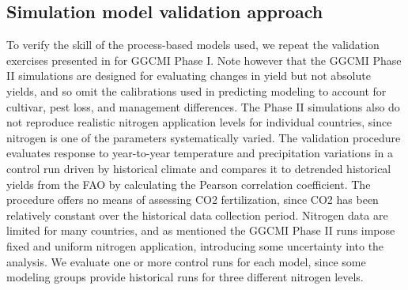 \documentclass[preprint, 5p, times, twocolumn]{elsarticle}
\begin{document}
\subsection{Simulation model validation approach}
To verify the skill of the process-based models used, we repeat the validation exercises presented in \citet{muller_global_2017} for GGCMI Phase I. Note however that the GGCMI Phase II simulations are designed for evaluating changes in yield but not absolute yields, and so omit the calibrations used in predicting modeling to account for cultivar, pest loss, and management differences. The Phase II simulations also do not reproduce realistic nitrogen application levels for individual countries, since nitrogen is one of the parameters systematically varied. The \citet{muller_global_2017} validation procedure evaluates response to year-to-year temperature and precipitation variations in a control run driven by historical climate and compares it to detrended historical yields from the FAO \citep{FAOSTAT} by calculating the Pearson correlation coefficient. The procedure offers no means of assessing CO2 fertilization, since CO2 has been relatively constant over the historical data collection period. Nitrogen data are limited for many countries, and as mentioned the GGCMI Phase II runs impose fixed and uniform nitrogen application, introducing some uncertainty into the analysis. We evaluate one or more control runs for each model, since some modeling groups provide historical runs for three different nitrogen levels.
\end{document}
